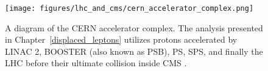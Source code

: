 \begin{figure}[hbtp]
\centering
\texttt{[image: figures/lhc\_and\_cms/cern\_accelerator\_complex.png]}
\caption{A diagram of the CERN accelerator complex. The analysis presented in Chapter~\ref{displaced_leptons} utilizes protons accelerated by LINAC 2, BOOSTER (also known as PSB), PS, SPS, and finally the LHC before their ultimate collision inside CMS \cite{cern_accelerator_complex}.}
\label{cern_accelerator_complex}
\end{figure}